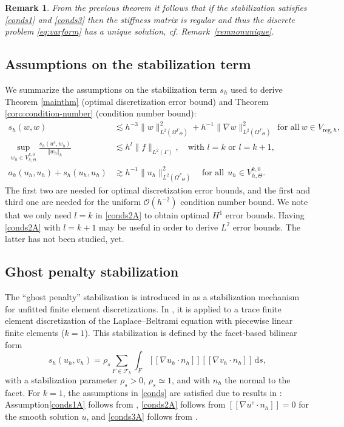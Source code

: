 \documentclass[final]{siamltex}
\newtheorem{remark}{Remark}
\begin{document}
\begin{remark} \label{uniquesol} \rm From the previous theorem it follows that if the stabilization satisfies \eqref{conds1} and \eqref{conds3} then the stiffness matrix is regular and thus the discrete problem \eqref{eq:varform} has a unique solution, cf. Remark~\ref{remnonunique}.
\end{remark}

\subsection{Assumptions on the stabilization term}
We summarize the assumptions on the stabilization term $s_h$ used to derive Theorem \ref{mainthm} (optimal discretization error bound) and Theorem \ref{coro:condition-number} (condition number bound):
\begin{subequations} \label{conds}
\begin{align}
  s_h(w,w) & \lesssim h^{-3}\|w\|_{L^2({\Omega^{\Gamma}}_\Theta)}^2 + h^{-1} \|\nabla w\|_{L^2({\Omega^{\Gamma}}_\Theta)}^2 ~~\text{for all}~w \in {V_{\text{reg},h}}, \label{conds1A} \\ 
\sup_{w_h \in {V_{h,\Theta}^{k,0}}} \frac{s_h(u^e,w_h)}{{\Vert {w_h} \Vert_h}} & \lesssim h^{l}\|f\|_{L^2(\Gamma)}, \quad \text{with }l=k \text{ or } l=k+1, \label{conds2A} \\
\!\!\! a_h(u_h,u_h) + s_h(u_h,u_h) & \gtrsim h^{-1} \| u_h\|_{L^2({\Omega^{\Gamma}}_\Theta)}^2 \quad \text{for all}~~u_h \in {V_{h,\Theta}^{k,0}}. \label{conds3A} 
\end{align}
\end{subequations}
The first two are needed for optimal discretization error bounds, and the first and third one are needed for the uniform $\mathcal{O}(h^{-2})$ condition number bound.
We note that we only need $l=k$ in \eqref{conds2A} to obtain optimal $H^1$ error bounds. Having \eqref{conds2A} with $l=k+1$ may be useful in order to derive $L^2$ error bounds. The latter has not been studied, yet.\\

\subsection{Ghost penalty stabilization} \label{sec:ghostpen}
The ``ghost penalty'' stabilization is introduced in \cite{Burman2010} as a stabilization mechanism for unfitted finite element discretizations. In \cite{BHL15}, it is applied to a trace finite element discretization of the Laplace--Beltrami equation with piecewise linear finite elements ($k=1$). This stabilization is defined by the facet-based bilinear form 
\[
s_h(u_h,v_h) = \rho_s \sum_{F \in \mathcal{F}_h} \int_F {[\![{\nabla u_h \cdot n_h}]\!]} {[\![{\nabla v_h \cdot n_h}]\!]} {\,\mathrm{d} {s}},
\]
with a stabilization parameter $\rho_s > 0$, $\rho_s \simeq 1$, and with $n_h$ the normal to the facet.
For $k=1$, the assumptions in \eqref{conds} are satisfied due to results in \cite{BHL15}: Assumption\eqref{conds1A} follows from \cite[Lemma 4.6]{BHL15}, \eqref{conds2A} follows from ${[\![{\nabla u^e \cdot n_h}]\!]}=0$ for the smooth solution $u$, and \eqref{conds3A} follows from \cite[Lemma 4.5]{BHL15}.
\end{document}
